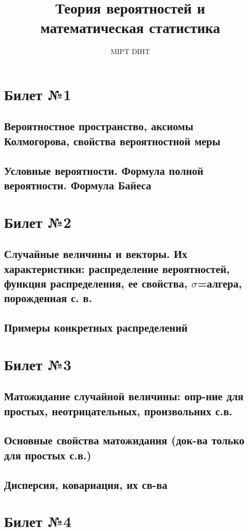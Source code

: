 \documentclass[a4paper]{article}
\title{Теория вероятностей и математическая статистика}
\author{MIPT DIHT}
\begin{document}
\maketitle

\section{Билет №1}
\subsection{Вероятностное пространство, аксиомы Колмогорова, свойства вероятностной меры}
\subsection{Условные вероятности. Формула полной вероятности. Формула Байеса}

\section{Билет №2}
\subsection{Случайные величины и векторы. Их характеристики: распределение вероятностей, функция распределения, ее свойства, $\sigma$=алгера, порожденная с. в.}
\subsection{Примеры конкретных распределений}

\section{Билет №3}
\subsection{Матожидание случайной величины: опр-ние для простых, неотрицательных, произвольних с.в.}
\subsection{Основные свойства матожидания (док-ва только для простых с.в.)}
\subsection{Дисперсия, ковариация, их св-ва}

\section{Билет №4}
\end{document}
